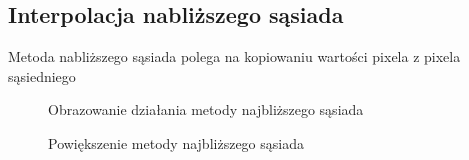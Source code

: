 \documentclass{article}
\begin{document}
    \subsection{Interpolacja nabliższego sąsiada}
    Metoda nabliższego sąsiada polega na kopiowaniu wartości pixela z pixela sąsiedniego
    \begin{figure}[h]
        \caption{\label{fig:rungeg} Obrazowanie działania metody najbliższego sąsiada}
    \end{figure}
    \begin{figure}[h]
        \caption{\label{fig:rungeg} Powiększenie metody najbliższego sąsiada}
    \end{figure}
    
    \pagebreak
\end{document}
